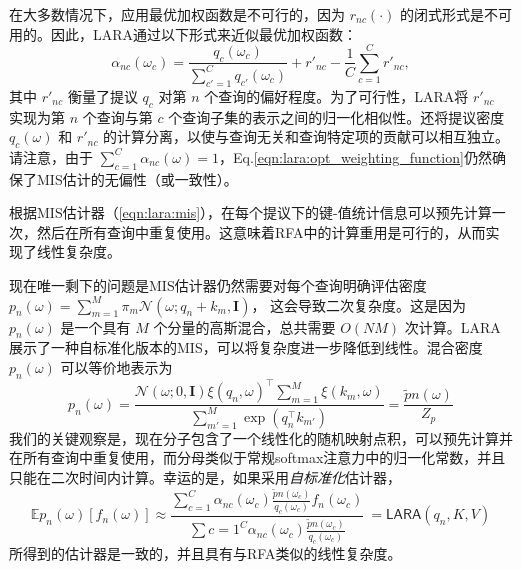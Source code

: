 在大多数情况下，应用最优加权函数是不可行的，因为 $r_{nc}(\cdot)$ 的闭式形式是不可用的。因此，LARA通过以下形式来近似最优加权函数：
\begin{equation}
\alpha_{nc}(\omega_c) = \frac{q_c(\omega_c)}{\sum_{c'=1}^C q_{c'}(\omega_c)} + r'_{nc} - \frac{1}{C}\sum_{c=1}^Cr'_{nc},\label{eqn:lara:opt_weighting_function}
\end{equation}
其中 $r'_{nc}$ 衡量了提议 $q_c$ 对第 $n$ 个查询的偏好程度。为了可行性，LARA将 $r'_{nc}$ 实现为第 $n$ 个查询与第 $c$ 个查询子集的表示之间的归一化相似性。还将提议密度 $q_c(\omega)$ 和 $r'_{nc}$ 的计算分离，以使与查询无关和查询特定项的贡献可以相互独立。请注意，由于 $\sum_{c=1}^C \alpha_{nc}(\omega) = 1$，Eq.\ref{eqn:lara:opt_weighting_function}仍然确保了MIS估计的无偏性（或一致性）。

\label{ssec:lara_snis}
根据MIS估计器（\ref{eqn:lara:mis}），在每个提议下的键-值统计信息可以预先计算一次，然后在所有查询中重复使用。这意味着RFA中的计算重用是可行的，从而实现了线性复杂度。

现在唯一剩下的问题是MIS估计器仍然需要对每个查询明确评估密度 
$p_n(\omega)=\sum_{m=1}^M \pi_{m} \mathcal{N}(\omega; q_n + k_m, \mathbf{I})$，
这会导致二次复杂度。这是因为 $p_n(\omega)$ 是一个具有 $M$ 个分量的高斯混合，总共需要 $O(NM)$ 次计算。LARA展示了一种自标准化版本的MIS，可以将复杂度进一步降低到线性。混合密度 $p_n(\omega)$ 可以等价地表示为
\begin{equation}
\textstyle{
p_n(\omega) = \frac{\mathcal{N}(\omega;0,\mathbf{I}) \xi(q_n,\omega)^\top \sum_{m=1}^M \xi(k_{m}, \omega)}{\sum_{m'=1}^M \exp\left(q_n^\top k_{m'}\right)} = \frac{\tilde{p}n(\omega)}{Z_p}
}
\end{equation}
我们的关键观察是，现在分子包含了一个线性化的随机映射点积，可以预先计算并在所有查询中重复使用，而分母类似于常规softmax注意力中的归一化常数，并且只能在二次时间内计算。幸运的是，如果采用\emph{自标准化}估计器，
\begin{equation}
\label{eqn:lara}
\textstyle{
\mathbb{E}{p_n(\omega)}\left[f_n(\omega)\right] \approx
\frac{\sum_{c=1}^C\alpha_{nc}(\omega_c)\frac{\tilde{p}n(\omega_c)}{q_c(\omega_c)} f_n(\omega_c)}{\sum{c=1}^C\alpha_{nc}(\omega_c)\frac{\tilde{p}n(\omega_c)}{q_c(\omega_c)}} \
= \mathsf{LARA}\left(q_{n},K,V\right)
}
\end{equation}
所得到的估计器是一致的，并且具有与RFA类似的线性复杂度。